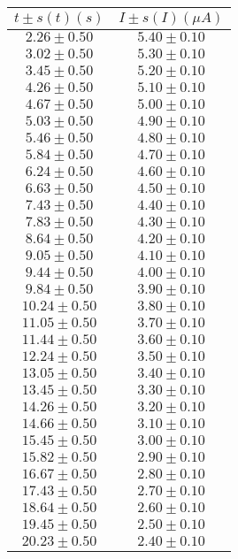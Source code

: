 \begin{table}[H]
\centering
\setlength{\arrayrulewidth}{1.2pt}
\begin{tabular}{|c|c|}
\hline
$t \pm s(t) (s)$ & $I \pm s(I) (\mu A)$ \\
\hline
$2.26 \pm 0.50$ & $5.40 \pm 0.10$ \\
$3.02 \pm 0.50$ & $5.30 \pm 0.10$ \\
$3.45 \pm 0.50$ & $5.20 \pm 0.10$ \\
$4.26 \pm 0.50$ & $5.10 \pm 0.10$ \\
$4.67 \pm 0.50$ & $5.00 \pm 0.10$ \\
$5.03 \pm 0.50$ & $4.90 \pm 0.10$ \\
$5.46 \pm 0.50$ & $4.80 \pm 0.10$ \\
$5.84 \pm 0.50$ & $4.70 \pm 0.10$ \\
$6.24 \pm 0.50$ & $4.60 \pm 0.10$ \\
$6.63 \pm 0.50$ & $4.50 \pm 0.10$ \\
$7.43 \pm 0.50$ & $4.40 \pm 0.10$ \\
$7.83 \pm 0.50$ & $4.30 \pm 0.10$ \\
$8.64 \pm 0.50$ & $4.20 \pm 0.10$ \\
$9.05 \pm 0.50$ & $4.10 \pm 0.10$ \\
$9.44 \pm 0.50$ & $4.00 \pm 0.10$ \\
$9.84 \pm 0.50$ & $3.90 \pm 0.10$ \\
$10.24 \pm 0.50$ & $3.80 \pm 0.10$ \\
$11.05 \pm 0.50$ & $3.70 \pm 0.10$ \\
$11.44 \pm 0.50$ & $3.60 \pm 0.10$ \\
$12.24 \pm 0.50$ & $3.50 \pm 0.10$ \\
$13.05 \pm 0.50$ & $3.40 \pm 0.10$ \\
$13.45 \pm 0.50$ & $3.30 \pm 0.10$ \\
$14.26 \pm 0.50$ & $3.20 \pm 0.10$ \\
$14.66 \pm 0.50$ & $3.10 \pm 0.10$ \\
$15.45 \pm 0.50$ & $3.00 \pm 0.10$ \\
$15.82 \pm 0.50$ & $2.90 \pm 0.10$ \\
$16.67 \pm 0.50$ & $2.80 \pm 0.10$ \\
$17.43 \pm 0.50$ & $2.70 \pm 0.10$ \\
$18.64 \pm 0.50$ & $2.60 \pm 0.10$ \\
$19.45 \pm 0.50$ & $2.50 \pm 0.10$ \\
$20.23 \pm 0.50$ & $2.40 \pm 0.10$ \\

\end{tabular}
\end{table}
